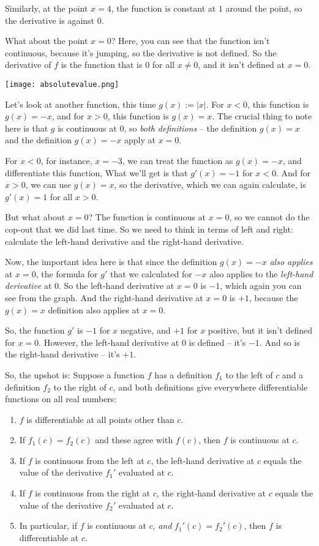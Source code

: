 \documentclass[10pt]{amsart}
\begin{document}
Similarly, at the point $x = 4$, the function is constant at $1$
around the point, so the derivative is against $0$.

What about the point $x = 0$? Here, you can see that the function
isn't continuous, because it's jumping, so the derivative is not
defined. So the derivative of $f$ is the function that is $0$ for all
$x \ne 0$, and it isn't defined at $x = 0$.

\texttt{[image: absolutevalue.png]}

Let's look at another function, this time $g(x) := |x|$. For $x < 0$,
this function is $g(x) = -x$, and for $x > 0$, this function is $g(x)
= x$. The crucial thing to note here is that $g$ is continuous at $0$,
so {\em both definitions} -- the definition $g(x) = x$ and the
definition $g(x) = -x$ apply at $x = 0$.

For $x < 0$, for instance, $x = -3$, we can treat the function as
$g(x) = -x$, and differentiate this function, What we'll get is that
$g'(x) = -1$ for $x < 0$. And for $x > 0$, we can use $g(x) = x$, so
the derivative, which we can again calculate, is $g'(x) = 1$ for all
$x > 0$.

But what about $x = 0$? The function is continuous at $x = 0$, so we
cannot do the cop-out that we did last time. So we need to think in
terms of left and right: calculate the left-hand derivative and the
right-hand derivative.

Now, the important idea here is that since the definition $g(x) = -x$
{\em also applies} at $x = 0$, the formula for $g'$ that we calculated
for $-x$ also applies to the {\em left-hand derivative} at $0$. So the
left-hand derivative at $x = 0$ is $-1$, which again you can see from
the graph. And the right-hand derivative at $x = 0$ is $+1$, because
the $g(x) = x$ definition also applies at $x = 0$.

So, the function $g'$ is $-1$ for $x$ negative, and $+1$ for $x$
positive, but it isn't defined for $x = 0$. However, the left-hand
derivative at $0$ is defined -- it's $-1$. And so is the right-hand
derivative -- it's $+1$.

So, the upshot is: Suppose a function $f$ has a definition $f_1$ to the
left of $c$ and a definition $f_2$ to the right of $c$, and both
definitions give everywhere differentiable functions on all real
numbers:

\begin{enumerate}
\item $f$ is differentiable at all points other than $c$.
\item If $f_1(c) = f_2(c)$ and these agree with $f(c)$, then $f$ is
  continuous at $c$.
\item If $f$ is continuous from the left at $c$, the left-hand
  derivative at $c$ equals the value of the derivative $f_1'$ evaluated
  at $c$.
\item If $f$ is continuous from the right at $c$, the right-hand
  derivative at $c$ equals the value of the derivative $f_2'$ evaluated
  at $c$.
\item In particular, if $f$ is continuous at $c$, {\em and} $f_1'(c) =
  f_2'(c)$, then $f$ is differentiable at $c$.
\end{enumerate}
\end{document}
